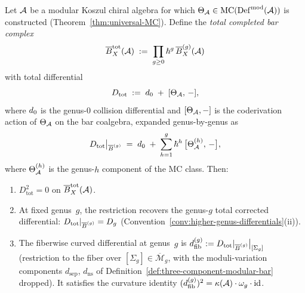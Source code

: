\begin{theorem}\label{thm:total-differential-from-mc}
Let $\mathcal{A}$ be a modular Koszul chiral algebra for which
$\Theta_{\mathcal{A}} \in
\operatorname{MC}(\operatorname{Def}^{\mathrm{mod}}(\mathcal{A}))$
is constructed
\textup{(}Theorem~\textup{\ref{thm:universal-MC})}.
Define the \emph{total completed bar complex}
\begin{equation}\label{eq:completed-bar-total}
\overline{B}^{\mathrm{tot}}_X(\mathcal{A})
\;:=\;
\prod_{g \geq 0} \hbar^{g}\,
\overline{B}_X^{(g)}(\mathcal{A})
\end{equation}
with total differential
\begin{equation}\label{eq:D-total-from-theta}
D_{\mathrm{tot}}
\;:=\;
d_0 \;+\; [\Theta_{\mathcal{A}},\, -],
\end{equation}
where $d_0$ is the genus-$0$ collision differential and
$[\Theta_{\mathcal{A}}, -]$ is the coderivation action of $\Theta_{\mathcal{A}}$ on
the bar coalgebra, expanded genus-by-genus as
\begin{equation}\label{eq:D-total-expanded}
D_{\mathrm{tot}}\big|_{\overline{B}^{(g)}}
\;=\;
d_0 \;+\;
\sum_{h=1}^{g} \hbar^{h}\,
\bigl[\Theta_{\mathcal{A}}^{(h)},\, -\bigr],
\end{equation}
where $\Theta_{\mathcal{A}}^{(h)}$ is the genus-$h$ component of the MC
class.
Then:
\begin{enumerate}[label=\textup{(\roman*)}]
\item $D_{\mathrm{tot}}^2 = 0$ on
  $\overline{B}^{\mathrm{tot}}_X(\mathcal{A})$.
\item At fixed genus~$g$, the restriction recovers the
  genus-$g$ total corrected differential:
  $D_{\mathrm{tot}}|_{\overline{B}^{(g)}} = D_{g}$
  \textup{(}Convention~\textup{\ref{conv:higher-genus-differentials}(ii))}.
\item The fiberwise curved differential at genus~$g$ is
  $d_{\mathrm{fib}}^{(g)} := D_{\mathrm{tot}}|_{\overline{B}^{(g)}}
  \big|_{[\Sigma_g]}$
  (restriction to the fiber over $[\Sigma_g] \in
  \overline{\mathcal{M}}_g$, with the moduli-variation components
  $d_{\mathrm{sep}}$, $d_{\mathrm{ns}}$ of
  Definition~\textup{\ref{def:three-component-modular-bar}}
  dropped).  It satisfies the curvature identity
  $(d_{\mathrm{fib}}^{(g)})^2 = \kappa(\mathcal{A}) \cdot \omega_g \cdot
  \operatorname{id}$.
\end{enumerate}
\end{theorem}

